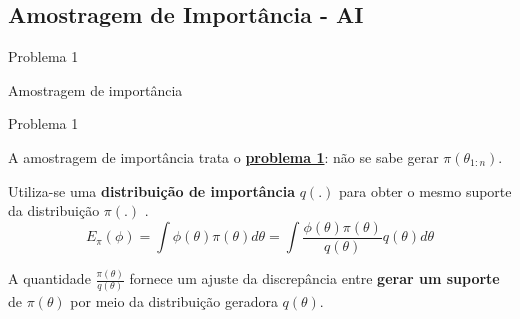 \documentclass{beamer}
\begin{document}
\subsection{Amostragem de Importância - AI}

\begin{frame}{Problema 1}
    \begin{block}{}
      \Huge  Amostragem de importância
    \end{block}
\end{frame}


\begin{frame}{Problema 1}

A amostragem de importância trata o \textbf{\underline{problema 1}}: não se sabe gerar $\pi(\theta_{1:n})$.

\vspace{0.5cm}
\pause

Utiliza-se uma \textbf{distribuição de importância} $q(.)$ para obter o mesmo suporte da distribuição $\pi(.)$ .
$$
E_{\pi}(\phi)=\int \phi(\theta) \pi(\theta) d\theta = \int \frac{ \phi(\theta) \pi(\theta)}{q(\theta)} q(\theta) d\theta
$$

\pause
A quantidade $\frac{\pi(\theta)}{q(\theta)}$  fornece um ajuste da discrepância entre \textbf{gerar um suporte} de $\pi(\theta)$ por meio da distribuição geradora $q(\theta)$.

\end{frame}



\end{document}
